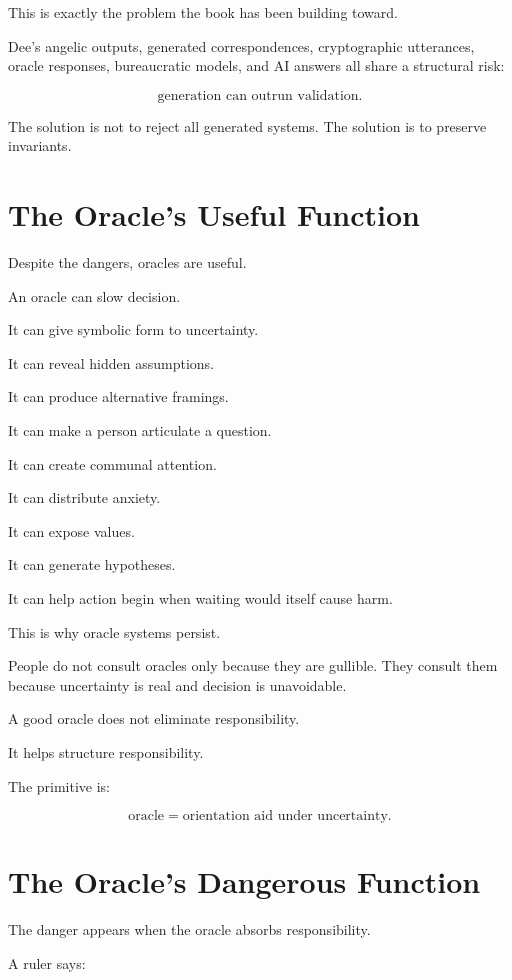 \documentclass[11pt]{book}
\begin{document}
This is exactly the problem the book has been building toward.

Dee's angelic outputs, generated correspondences, cryptographic utterances, oracle responses, bureaucratic models, and AI answers all share a structural risk:

\[
\text{generation can outrun validation}.
\]

The solution is not to reject all generated systems. The solution is to preserve invariants.

\section{The Oracle's Useful Function}

Despite the dangers, oracles are useful.

An oracle can slow decision.

It can give symbolic form to uncertainty.

It can reveal hidden assumptions.

It can produce alternative framings.

It can make a person articulate a question.

It can create communal attention.

It can distribute anxiety.

It can expose values.

It can generate hypotheses.

It can help action begin when waiting would itself cause harm.

This is why oracle systems persist.

People do not consult oracles only because they are gullible. They consult them because uncertainty is real and decision is unavoidable.

A good oracle does not eliminate responsibility.

It helps structure responsibility.

The primitive is:

\[
\text{oracle} = \text{orientation aid under uncertainty}.
\]

\section{The Oracle's Dangerous Function}

The danger appears when the oracle absorbs responsibility.

A ruler says:
\end{document}
